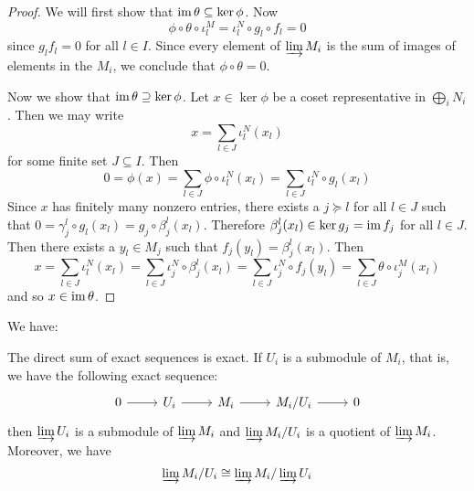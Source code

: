 \begin{proof}
	We will first show that $\operatorname{im}\theta \subseteq \ker\phi$.
	Now
	\[\phi\circ\theta\circ\iota_l^M = \iota_l^N\circ g_l\circ f_l = 0\]
	since $g_lf_l=0$ for all $l \in I$.
	Since every element of $\varinjlim M_i$ is the sum of images of elements in the $M_i$, we conclude that $\phi\circ\theta=0$.
	
	Now we show that $\operatorname{im}\theta \supseteq \ker\phi$.
	Let $x \in \ker\phi$ be a coset representative in $\bigoplus_i N_i$.
	Then we may write
	\[x=\sum_{l\in J} \iota_l^N(x_l)\]
	for some finite set $J \subseteq I$.
	Then
	\[0=\phi(x) = \sum_{l \in J} \phi\circ\iota_l^N (x_l) = \sum_{l \in J} \iota_l^N\circ g_l(x_l)\]
	Since $x$ has finitely many nonzero entries, there exists a $j \succeq l$ for all $l \in J$ such that $0 = \gamma_j^l\circ g_l(x_l) = g_j\circ\beta_j^l(x_l)$.
	Therefore $\beta_j^l(x_l) \in \ker g_j = \operatorname{im} f_j$ for all $l \in J$.
	Then there exists a $y_l \in M_j$ such that $f_j(y_l) = \beta_j^l(x_l)$.
	Then
	\[x = \sum_{l\in J} \iota_l^N(x_l) = \sum_{l \in J} \iota_j^N\circ\beta_j^l(x_l) = \sum_{l \in J} \iota_j^N \circ f_j(y_l) = \sum_{l \in J} \theta\circ\iota_j^M(x_l)\]
	and so $x \in \operatorname{im}\theta$.
\end{proof}

\begin{rmk}
	We have:
	\begin{enum}
		\io The direct sum of exact sequences is exact.
		\io If $U_i$ is a submodule of $M_i$, that is, we have the following exact sequence:
		\[\begin{tikzcd}
			0 \ar[r] & U_i \ar[r] & M_i \ar[r] & M_i/U_i \ar[r] & 0
		\end{tikzcd}\]
		then $\varinjlim U_i$ is a submodule of $\varinjlim M_i$ and $\varinjlim M_i/U_i$ is a quotient of $\varinjlim M_i$.
		Moreover, we have
		\[\varinjlim M_i/U_i \cong \varinjlim M_i / \varinjlim U_i\]
	\end{enum}
\end{rmk}

